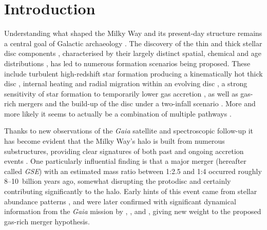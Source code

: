 \documentclass[fleqn,usenatbib]{mnras}
\begin{document}

\section{Introduction}
\label{sec:introduction}

Understanding what shaped the Milky Way and its present-day structure remains a central goal of Galactic archaeology \citep{FreemanBlandHawthorn2002,BlandHawthorn_Gerhard2016}. The discovery of the thin and thick stellar disc components \citep{Yoshii1982, Gilmore1983}, characterised by their largely distinct spatial, chemical and age distributions \citep[for example][]{Bensby2014, Hayden2015}, has led to numerous formation scenarios being proposed. These include turbulent high-redshift star formation producing a kinematically hot thick disc \citep{Bird2013, Stinson2013}, internal heating and radial migration within an evolving disc \citep{Schoenrich2009, Minchev2013, Sharma2021b}, a strong sensitivity of star formation to temporarily lower gas accretion \citep{Grand2018, Orkney2026b}, as well as gas-rich mergers \citep{Brook2004, Buck2020} and the build-up of the disc under a two-infall scenario \citep{Chiappini1997, Spitoni2019}. More and more likely it seems to actually be a combination of multiple pathways \citep[e.g.][]{Orkney2026b}.

Thanks to new observations of the \textit{Gaia} satellite \citep{Brown2021b} and spectroscopic follow-up it has become evident that the Milky Way's halo is built from numerous substructures, providing clear signatures of both past and ongoing accretion events \citep{Belokurov2006, Myeong2018c, Koppelman2019, Naidu2020, Yuan2020, Dodd2023}. One particularly influential finding is that a major merger (hereafter called \textit{GSE}) with an estimated mass ratio between 1:2.5 and 1:4 \citep{Helmi2018, Naidu2020} occurred roughly 8–10~billion years ago, somewhat disrupting the protodisc and certainly contributing significantly to the halo. Early hints of this event came from stellar abundance patterns \citep{Nissen2010}, and were later confirmed with significant dynamical information from the \textit{Gaia} mission \citep{Brown2016, Brown2018} by \citet{Belokurov2018}, \citet{Haywood2018b}, and \citet{Helmi2018}, giving new weight to the proposed gas-rich merger hypothesis.
\end{document}
